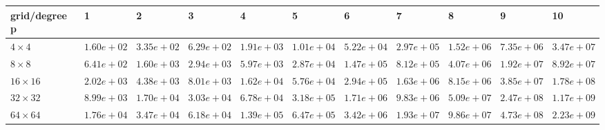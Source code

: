 \begin{tabular}{lllllllllll}
\hline
 grid/degree p   & 1          & 2          & 3          & 4          & 5          & 6          & 7          & 8          & 9          & 10         \\
\hline
 $4 \times 4$    & $1.60e+02$ & $3.35e+02$ & $6.29e+02$ & $1.91e+03$ & $1.01e+04$ & $5.22e+04$ & $2.97e+05$ & $1.52e+06$ & $7.35e+06$ & $3.47e+07$ \\
 $8 \times 8$    & $6.41e+02$ & $1.60e+03$ & $2.94e+03$ & $5.97e+03$ & $2.87e+04$ & $1.47e+05$ & $8.12e+05$ & $4.07e+06$ & $1.92e+07$ & $8.92e+07$ \\
 $16 \times 16$  & $2.02e+03$ & $4.38e+03$ & $8.01e+03$ & $1.62e+04$ & $5.76e+04$ & $2.94e+05$ & $1.63e+06$ & $8.15e+06$ & $3.85e+07$ & $1.78e+08$ \\
 $32 \times 32$  & $8.99e+03$ & $1.70e+04$ & $3.03e+04$ & $6.78e+04$ & $3.18e+05$ & $1.71e+06$ & $9.83e+06$ & $5.09e+07$ & $2.47e+08$ & $1.17e+09$ \\
 $64 \times 64$  & $1.76e+04$ & $3.47e+04$ & $6.18e+04$ & $1.39e+05$ & $6.47e+05$ & $3.42e+06$ & $1.93e+07$ & $9.86e+07$ & $4.73e+08$ & $2.23e+09$ \\
\hline
\end{tabular}